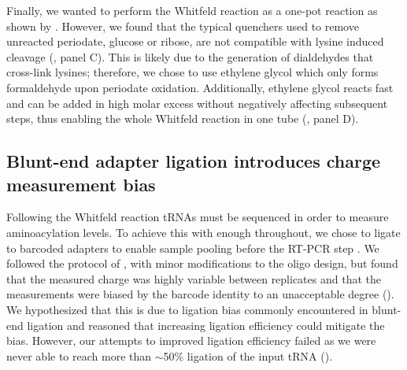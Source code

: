 \documentclass[9pt,lineno]{elife}
\begin{document}
Finally, we wanted to perform the Whitfeld reaction as a one-pot reaction as shown by \cite{Watkins2022-er}.
However, we found that the typical quenchers used to remove unreacted periodate, glucose or ribose, are not compatible with lysine induced cleavage (, panel C).
This is likely due to the generation of dialdehydes that cross-link lysines; therefore, we chose to use ethylene glycol which only forms formaldehyde upon periodate oxidation.
Additionally, ethylene glycol reacts fast and can be added in high molar excess without negatively affecting subsequent steps, thus enabling the whole Whitfeld reaction in one tube (, panel D).



\subsection{Blunt-end adapter ligation introduces charge measurement bias}
Following the Whitfeld reaction tRNAs must be sequenced in order to measure aminoacylation levels.
To achieve this with enough throughout, we chose to ligate to barcoded adapters to enable sample pooling before the RT-PCR step \citep{McGlincy2017-ro}.
We followed the protocol of \cite{Behrens2021-gb}, with minor modifications to the oligo design, but found that the measured charge was highly variable between replicates and that the measurements were biased by the barcode identity to an unacceptable degree ().
We hypothesized that this is due to ligation bias commonly encountered in blunt-end ligation \citep{Fuchs2015-nb, Zhuang2012-nu, Jayaprakash2011-ab} and reasoned that increasing ligation efficiency could mitigate the bias.
However, our attempts to improved ligation efficiency failed as we were never able to reach more than $\sim$50\% ligation of the input tRNA ().
\end{document}
